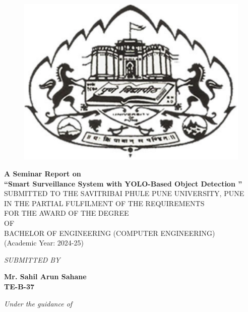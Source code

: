 \documentclass[openany,12pt]{report}
\begin{document}
\lhead{}
\chead{}
\setlength{\headrulewidth}{0.4pt}
\setlength{\footrulewidth}{0.4pt}
\fontsize{12}{15}
\begin{titlepage}
\begin{figure}
    \centering
    \includegraphics [width=0.2\linewidth] {puneuni-eps-converted-to.pdf}
\end{figure}
\begin{center}
{\bf A Seminar Report on} \\
\vspace{0.3in}
{\Large \bf ``Smart Surveillance System with YOLO-Based Object Detection
''}\\
\vspace{0.3in}
SUBMITTED TO THE SAVITRIBAI PHULE PUNE UNIVERSITY, PUNE\\
IN THE PARTIAL FULFILMENT OF THE REQUIREMENTS \\
FOR THE AWARD OF THE DEGREE \\
\vspace{0.2in}
OF\\  
\vspace{0.2in}
BACHELOR OF ENGINEERING (COMPUTER ENGINEERING)\\
(Academic Year: 2024-25)\\
\vspace{0.2in}

{\it SUBMITTED BY}\\

\vspace{0.2in}

{\bf Mr. Sahil Arun Sahane}\hspace{0.32in}  \\
{\bf TE-B-37 }\hspace{0.3in} \\

\vspace{0.4in}

{\it Under the guidance of}\\

\vspace{0.1in}


\end{center}
\end{titlepage}
\end{document}
